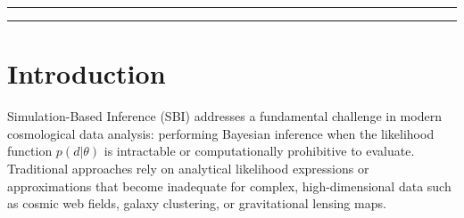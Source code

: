 \documentclass{SciPost}
\begin{document}
\vspace{\baselineskip}

\noindent\textcolor{white!90!black}{%
}


\linenumbers

\vspace{10pt}
\noindent\rule{\textwidth}{1pt}
\tableofcontents
\noindent\rule{\textwidth}{1pt}
\vspace{10pt}

\section*{Introduction}

Simulation-Based Inference (SBI) addresses a fundamental challenge in modern cosmological data analysis: performing Bayesian inference when the likelihood function $p(d|\theta)$ is intractable or computationally prohibitive to evaluate. Traditional approaches rely on analytical likelihood expressions or approximations that become inadequate for complex, high-dimensional data such as cosmic web fields, galaxy clustering, or gravitational lensing maps.
\end{document}
